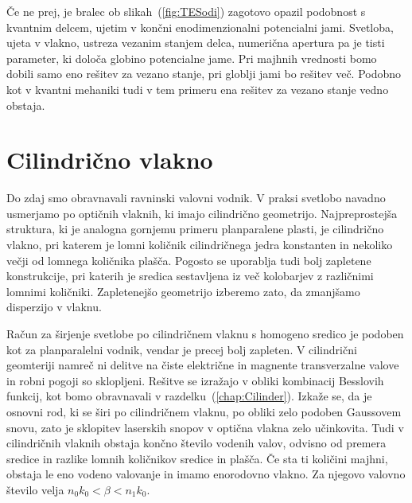 \begin{remark}
Če ne prej, je bralec ob slikah~(\ref{fig:TESodi}) zagotovo opazil podobnost s kvantnim delcem, ujetim
v končni enodimenzionalni potencialni jami. Svetloba, ujeta v vlakno, ustreza vezanim stanjem delca,
numerična apertura pa je tisti parameter, ki določa globino potencialne jame. Pri majhnih vrednosti bomo
dobili samo eno rešitev za vezano stanje, pri globlji jami bo rešitev več. Podobno kot v kvantni mehaniki
tudi v tem primeru ena rešitev za vezano stanje vedno obstaja. 
\end{remark}

\section{Cilindrično vlakno}
Do zdaj smo obravnavali ravninski valovni vodnik. V praksi svetlobo
navadno usmerjamo po optičnih vlaknih, ki imajo cilindrično geometrijo.
Najpreprostejša struktura, ki je analogna gornjemu primeru planparalene
plasti, je cilindrično vlakno, pri katerem je lomni količnik cilindričnega
jedra konstanten in nekoliko večji od lomnega količnika plašča. Pogosto se uporablja
tudi bolj zapletene konstrukcije, pri katerih je sredica sestavljena iz več 
kolobarjev z različnimi lomnimi količniki. Zapletenejšo geometrijo izberemo zato, 
da zmanjšamo disperzijo v vlaknu. 

Račun za širjenje svetlobe po cilindričnem vlaknu s homogeno sredico
je podoben kot za planparalelni vodnik, vendar je precej bolj
zapleten. V cilindrični geomteriji namreč ni delitve na čiste električne in 
magnente transverzalne valove in robni pogoji so sklopljeni. Rešitve se izražajo 
v obliki kombinacij Besslovih funkcij, kot bomo obravnavali v razdelku~(\ref{chap:Cilinder}).
Izkaže se, da je osnovni rod, ki se širi po cilindričnem vlaknu, po obliki zelo podoben
Gaussovem snovu, zato je sklopitev laserskih snopov v optična vlakna zelo učinkovita.
Tudi v cilindričnih vlaknih obstaja končno število vodenih valov, odvisno od premera sredice in
razlike lomnih količnikov sredice in plašča. Če sta ti količini majhni,
obstaja le eno vodeno valovanje in imamo enorodovno vlakno. Za njegovo
valovno število velja $n_{0}k_{0}<\beta<n_{1}k_{0}$.

